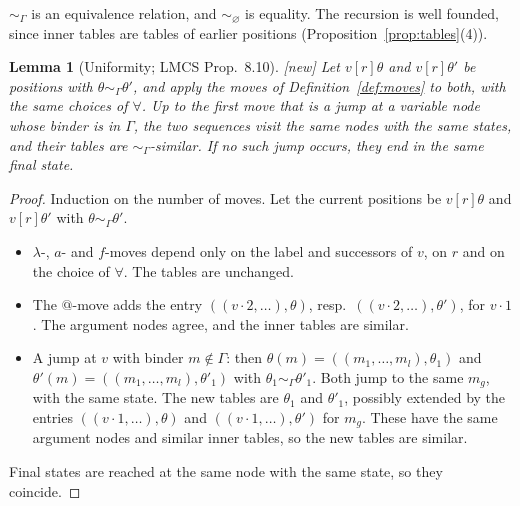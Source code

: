 \documentclass[11pt]{article}
\newcommand{\suc}[2]{#1{\cdot}#2}
\newcommand{\New}{\textsf{[new]}}
\theoremstyle{plain}
\newtheorem{lemma}[theorem]{Lemma}
\theoremstyle{definition}
\theoremstyle{remark}
\begin{document}
$\sim_\Gamma$ is an equivalence relation, and $\sim_\varnothing$ is
equality.  The recursion is well founded, since inner tables are tables
of earlier positions (Proposition~\ref{prop:tables}(4)).

\begin{lemma}[Uniformity; LMCS Prop.~8.10]\label{lem:uniform}
\New{} Let $v[r]\theta$ and $v[r]\theta'$ be positions with
$\theta\sim_\Gamma\theta'$, and apply the moves of
Definition~\ref{def:moves} to both, with the same choices of $\forall$.
Up to the first move that is a jump at a variable node whose binder is
in $\Gamma$, the two sequences visit the same nodes with the same
states, and their tables are $\sim_\Gamma$-similar.  If no such jump
occurs, they end in the same final state.
\end{lemma}
\begin{proof}
Induction on the number of moves.  Let the current positions be
$v[r]\theta$ and $v[r]\theta'$ with $\theta\sim_\Gamma\theta'$.
\begin{itemize}
\item $\lambda$-, $a$- and $f$-moves depend only on the label and
  successors of $v$, on $r$ and on the choice of $\forall$.  The tables
  are unchanged.
\item The $@$-move adds the entry $((\suc v2,\dots),\theta)$, resp.\
  $((\suc v2,\dots),\theta')$, for $\suc v1$.  The argument nodes agree,
  and the inner tables are similar.
\item A jump at $v$ with binder $m\notin\Gamma$: then
  $\theta(m)=((m_1,\dots,m_l),\theta_1)$ and
  $\theta'(m)=((m_1,\dots,m_l),\theta'_1)$ with
  $\theta_1\sim_\Gamma\theta'_1$.  Both jump to the same $m_g$, with the
  same state.  The new tables are $\theta_1$ and $\theta'_1$, possibly
  extended by the entries $((\suc v1,\dots),\theta)$ and
  $((\suc v1,\dots),\theta')$ for $m_g$.  These have the same argument
  nodes and similar inner tables, so the new tables are similar.
\end{itemize}
Final states are reached at the same node with the same state, so they
coincide.
\end{proof}
\end{document}
